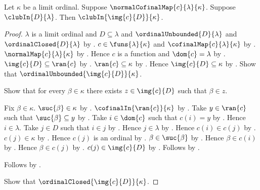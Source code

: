 \begin{theorem}\label{normal_cofinal_map_club_image}
    Let $\kappa$ be a limit ordinal.
    Suppose $\normalCofinalMap{c}{\lambda}{\kappa}$.
    Suppose $\clubIn{D}{\lambda}$.
    Then $\clubIn{\img{c}{D}}{\kappa}$.
\end{theorem}
\begin{proof}
    $\lambda$ is a limit ordinal and $D\subseteq\lambda$ and
        $\ordinalUnbounded{D}{\lambda}$ and
        $\ordinalClosed{D}{\lambda}$
        by .
    $c\in\funs{\lambda}{\kappa}$ and
        $\cofinalMap{c}{\lambda}{\kappa}$
        by .
    $\normalMap{c}{\lambda}{\kappa}$
        by .
    Hence $c$ is a function and $\dom{c}=\lambda$
        by .
    $\img{c}{D}\subseteq\ran{c}$ by .
    $\ran{c}\subseteq\kappa$ by .
    Hence $\img{c}{D}\subseteq\kappa$
        by .
    Show that $\ordinalUnbounded{\img{c}{D}}{\kappa}$.
    \begin{subproof}
        Show that for every $\beta\in\kappa$ there exists
            $z\in\img{c}{D}$ such that $\beta\in z$.
        \begin{subproof}
            Fix $\beta\in\kappa$.
            $\suc{\beta}\in\kappa$ by .
            $\cofinalIn{\ran{c}}{\kappa}$ by .
            Take $y\in\ran{c}$ such that $\suc{\beta}\subseteq y$
                by .
            Take $i\in\dom{c}$ such that $c(i)=y$
                by .
            Hence $i\in\lambda$.
            Take $j\in D$ such that $i\in j$
                by .
            Hence $j\in\lambda$ by .
            Hence $c(i)\in c(j)$
                by .
            $c(j)\in\kappa$ by .
            Hence $c(j)$ is an ordinal
                by .
            $\beta\in\suc{\beta}$ by .
            Hence $\beta\in c(i)$ by .
            Hence $\beta\in c(j)$ by .
            $c(j)\in\img{c}{D}$
                by .
            Follows by \auto.
        \end{subproof}
        Follows by .
    \end{subproof}
    Show that $\ordinalClosed{\img{c}{D}}{\kappa}$.

\end{proof}
